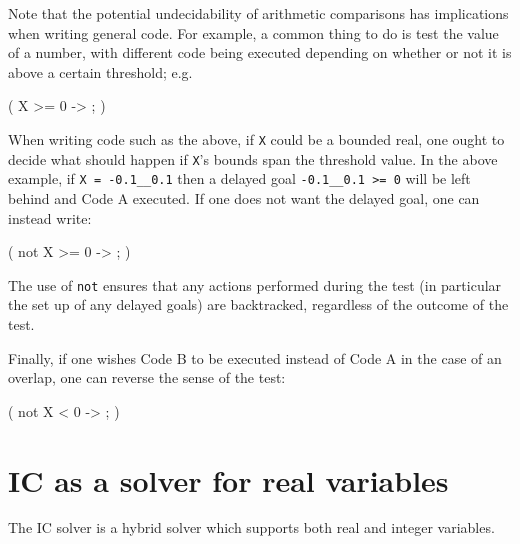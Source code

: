 Note that the potential undecidability of arithmetic comparisons has
implications when writing general code.  For example, a common thing to do
is test the value of a number, with different code being executed depending
on whether or not it is above a certain threshold; e.g.\

\begin{code}
( X >= 0 ->
;
)
\end{code}

When writing code such as the above, if \texttt{X} could be a bounded real,
one ought to decide what should happen if \texttt{X}'s bounds span the
threshold value.  In the above example, if \texttt{X = -0.1__0.1} then a
delayed goal \texttt{-0.1__0.1 >= 0} will be left behind and Code A
executed.  If one does not want the delayed goal, one can instead write:

\begin{code}
( not X >= 0 ->
;
)
\end{code}

The use of \texttt{not} ensures that any actions performed during the test
(in particular the set up of any delayed goals) are backtracked, regardless
of the outcome of the test.

Finally, if one wishes Code B to be executed instead of Code A in the case
of an overlap, one can reverse the sense of the test:

\begin{code}
( not X < 0 ->
;
)
\end{code}



\section{IC as a solver for real variables}


The IC solver is a hybrid solver which supports both real and integer
variables.





